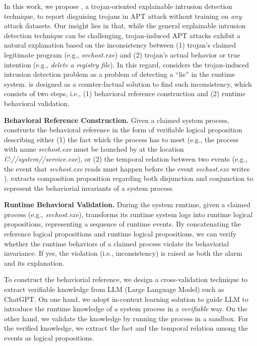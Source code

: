 In this work, we propose \tool,
a trojan-oriented explainable intrusion detection technique,
to report disguising trojans in APT attack without training on \textit{any} attack datasets.
Our insight lies in that,
while the general explainable intrusion detection technique can be challenging,
trojan-induced APT attacks exhibit a natural explanation based on
the inconsistency between 
(1) trojan's claimed legitimate program (e.g., \textit{svchost.exe}) and
(2) trojan's actual behavior or true intention (e.g., \textit{delete a registry file}).
In this regard, 
\tool considers the trojan-induced intrusion detection problem as a problem of
detecting a ``lie'' in the runtime system.
\tool is designed as a counter-factual solution to find such inconsistency,
which consists of two steps, i.e., 
(1) behavioral reference construction and
(2) runtime behavioral validation.

\noindent\textbf{Behavioral Reference Construction.}
Given a claimed system process, \tool constructs the behavioral reference in the form of 
verifiable logical proposition describing either
(1) the fact which the process has to meet (e.g., the process with name \textit{svchost.exe} must be launched by \textit{} at the location \textit{C://system//service.exe}), or
(2) the temporal relation between two events 
(e.g., the event that \textit{svchost.exe} reads  must happen before the event \textit{svchost.exe} writes ).
\tool extracts composition proposition regarding both disjunction and conjunction
to represent the behaviorial invariants of a system process.

\noindent\textbf{Runtime Behavioral Validation.}
During the system runtime,
given a claimed process (e.g., \textit{svchost.exe}),
\tool transforms its runtime system logs into runtime logical propositions, 
representing a sequence of runtime events.
By concatenating the reference logical propositions and runtime logical propositions,
we can verify whether the runtime behaviors of a claimed process violate its behaviorial invariance.
If yes, the violation (i.e., inconsistency) is raised as both the alarm and its explanation.


To construct the behaviorial reference, 
we design a cross-validation technique to extract verifiable knowledge from LLM (Large Language Model) such as ChatGPT.
On one hand, 
we adopt in-context learning solution to guide LLM to 
introduce the runtime knowledge of a system process in a \textit{verifiable} way.
On the other hand,
we validate the knowledge by running the process in a sandbox.
For the verified knowledge,
we extract the fact and the temporal relation among the events
as logical propositions.


